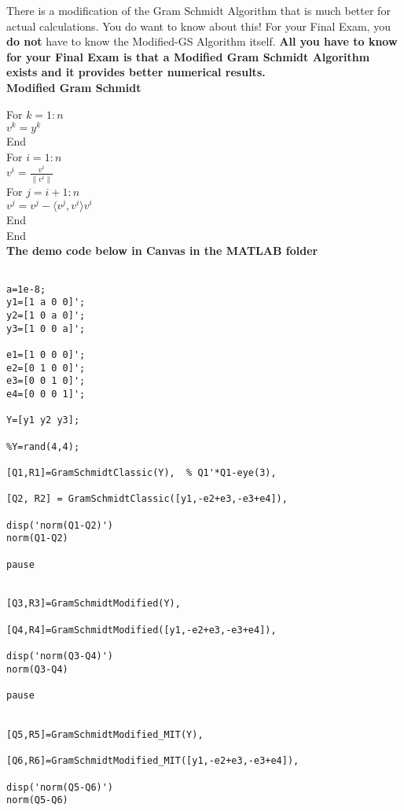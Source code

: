 \documentclass[letterpaper]{article}
\begin{document}
    \newpage

    There is a modification of the Gram Schmidt Algorithm that is much better for actual calculations. You do want to know about this! For your Final Exam, you \textbf{do not} have to know the Modified-GS Algorithm itself.\textbf{ All you have to know for your Final Exam is that a Modified Gram Schmidt Algorithm exists and it provides better numerical results.} \\

           \noindent \textbf{Modified Gram Schmidt}

        For $k=1:n$\\
        \indent\hspace{4ex}$v^k=y^k$\\
        End\\
        For $i=1:n$\\
        \indent\hspace{4ex}$v^i=\frac{v^i}{\|v^i\|}$\\
        \indent\hspace{4ex}For $j=i+1:n$\\
        \indent\hspace{8ex}$v^j=v^j-\langle v^j,v^i\rangle v^i$\\
        \indent\hspace{4ex}End\\
        End\\
        
        \textbf{The demo code below in Canvas in the MATLAB folder}
        
        \begin{verbatim}
        
a=1e-8;
y1=[1 a 0 0]';
y2=[1 0 a 0]';
y3=[1 0 0 a]';

e1=[1 0 0 0]';
e2=[0 1 0 0]';
e3=[0 0 1 0]';
e4=[0 0 0 1]';

Y=[y1 y2 y3];

%Y=rand(4,4);

[Q1,R1]=GramSchmidtClassic(Y),  % Q1'*Q1-eye(3),

[Q2, R2] = GramSchmidtClassic([y1,-e2+e3,-e3+e4]),    

disp('norm(Q1-Q2)')
norm(Q1-Q2)

pause


[Q3,R3]=GramSchmidtModified(Y),   

[Q4,R4]=GramSchmidtModified([y1,-e2+e3,-e3+e4]),    

disp('norm(Q3-Q4)')
norm(Q3-Q4)

pause


[Q5,R5]=GramSchmidtModified_MIT(Y),   

[Q6,R6]=GramSchmidtModified_MIT([y1,-e2+e3,-e3+e4]),    

disp('norm(Q5-Q6)')
norm(Q5-Q6)


        
        \end{verbatim}
        
\end{document}
